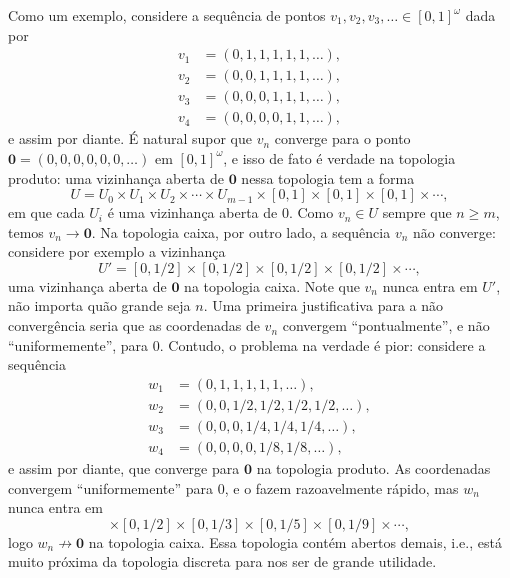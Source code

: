  Como um exemplo, considere a sequência de pontos
 $v_1, v_2, v_3, \dots \in [0,1]^{\omega}$
 dada por
 \begin{align*}
     v_1 &= (0, 1, 1, 1, 1, 1, \dots), \\
     v_2 &= (0, 0, 1, 1, 1, 1, \dots), \\
     v_3 &= (0, 0, 0, 1, 1, 1, \dots), \\
     v_4 &= (0, 0, 0, 0, 1, 1, \dots),
 \end{align*}
 e assim por diante. É natural supor que
 $v_n$
 converge para o ponto
 $\mathbf{0} = (0,0,0,0,0,0,\dots)$
 em
 $[0,1]^{\omega}$,
 e isso de fato é verdade na topologia produto:
 uma vizinhança aberta de 
 $\mathbf{0}$ 
 nessa topologia tem a forma
 \begin{equation*}
     U
     =
     U_0 \times U_1 \times U_2 \times \cdots \times U_{m-1} 
     \times [0,1] \times [0,1] \times [0,1] \times \cdots,
 \end{equation*}
 em que cada
 $U_i$
 é uma vizinhança aberta de
 $0$.
 Como
 $v_n \in U$
 sempre que 
 $n \geq m$,
 temos
 $v_n \to \mathbf{0}$.
 Na topologia caixa, por outro lado, a sequência
 $v_n$
 não converge: considere por exemplo a vizinhança
 \begin{equation*}
     U'
     =
     [0, 1/2] \times [0, 1/2] \times [0, 1/2] \times [0, 1/2] \times \cdots,
 \end{equation*}
 uma vizinhança aberta de
 $\mathbf{0}$
 na topologia caixa.
 Note que
 $v_n$
 nunca entra em
 $U'$,
 não importa quão grande seja
 $n$.
 Uma primeira justificativa para a não convergência seria que
 as coordenadas de
 $v_n$
 convergem ``pontualmente'', e não ``uniformemente'', para 
 $0$.
 Contudo, o problema na verdade é pior:
 considere a sequência
 \begin{align*}
     w_1 &= (0, 1, 1, 1, 1, 1, \dots), \\
     w_2 &= (0, 0, 1/2, 1/2, 1/2, 1/2, \dots), \\
     w_3 &= (0, 0, 0, 1/4, 1/4, 1/4, \dots), \\
     w_4 &= (0, 0, 0, 0, 1/8, 1/8, \dots),
 \end{align*}
 e assim por diante,
 que converge para
 $\mathbf{0}$
 na topologia produto.
 As coordenadas convergem ``uniformemente'' para 0,
 e o fazem razoavelmente rápido,
 mas
 $w_n$
 nunca entra em 
 \begin{equation*}
     [0,1] \times [0,1/2] \times [0,1/3] \times [0,1/5] \times [0,1/9] \times \cdots,
 \end{equation*}
 logo
 $w_n \not\to \mathbf{0}$
 na topologia caixa.
 Essa topologia contém abertos demais, i.e.,
 está muito próxima da topologia discreta para nos ser de grande utilidade.
 
